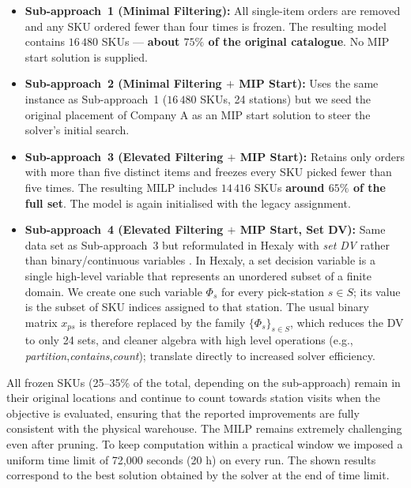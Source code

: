 \documentclass[11pt]{elsarticle}
\begin{document}
\begin{itemize} 
    \item \textbf{Sub-approach~1 (Minimal Filtering):}  
          All single-item orders are removed and any SKU ordered fewer than four times is frozen.  
          The resulting model contains $16\,480$ SKUs --- \textbf{about $75\%$ of the original catalogue}.  
          No MIP start solution is supplied.

    \item \textbf{Sub-approach~2 (Minimal Filtering $+$ MIP Start):}  
          Uses the same instance as Sub-approach~1 ($16\,480$ SKUs, 24 stations) but we seed the original placement of Company A as an MIP start solution to steer the solver's initial search.

    \item \textbf{Sub-approach~3 (Elevated Filtering $+$ MIP Start):}  
          Retains only orders with more than five distinct items and freezes every SKU picked fewer than five times.  
          The resulting MILP includes $14\,416$ SKUs \textbf{around $65\%$ of the full set}.  
          The model is again initialised with the legacy assignment.

    \item \textbf{Sub-approach~4 (Elevated Filtering $+$ MIP Start, Set DV):}  
          Same data set as Sub-approach~3 but reformulated in Hexaly with \emph{set DV} rather than binary/continuous variables \cite{blaisemodeling}. In Hexaly, a set decision variable is a single high-level variable that represents an unordered subset of a finite domain. We create one such variable \( \Phi_s \) for every pick-station $s\in S$; its value is the subset of SKU indices assigned to that station. The usual binary matrix $x_{ps}$ is therefore replaced by the family \( \{\Phi_s\}_{s \in S}\), which reduces the DV to only 24 sets, and cleaner algebra with high level operations (e.g., \textit{partition},\textit{contains},\textit{count}); translate directly to increased solver efficiency.
          
\end{itemize}

All frozen SKUs (25--35\% of the total, depending on the sub-approach) remain in their original locations and continue to count towards station visits when the objective is evaluated, ensuring that the reported improvements are fully consistent with the physical warehouse. \newline
The MILP remains extremely challenging even after pruning. To keep computation within a practical window we imposed a uniform time limit of 72,000 seconds (20 h) on every run. The shown results correspond to the best solution obtained by the solver at the end of time limit.
\end{document}
